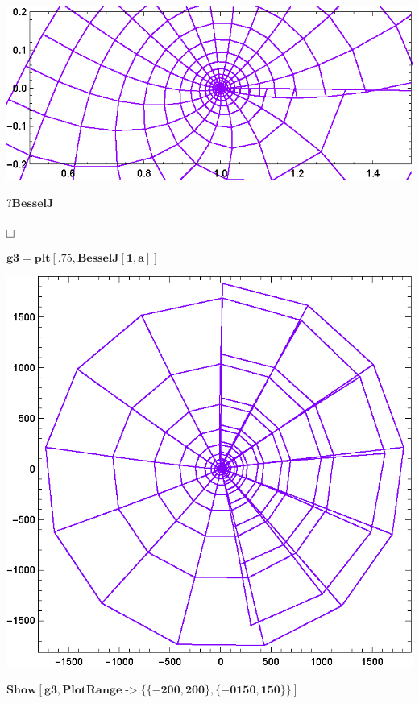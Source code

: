\documentclass{article}
\begin{document}
\includegraphics{functions_on_complex-plane_gr8.eps}

\begin{doublespace}
\noindent\(\pmb{?\text{BesselJ}}\)
\end{doublespace}

\begin{doublespace}
\noindent\(\fbox{$$}\)
\end{doublespace}

\begin{doublespace}
\noindent\(\pmb{\text{g3}=\text{plt}[.75,\text{BesselJ}[1,a]]}\)
\end{doublespace}

\includegraphics{functions_on_complex-plane_gr9.eps}

\begin{doublespace}
\noindent\(\pmb{\text{Show}[\text{g3},\text{PlotRange}\text{-$>$}\{\{-200,200\},\{-0150,150\}\}]}\)
\end{doublespace}
\end{document}
